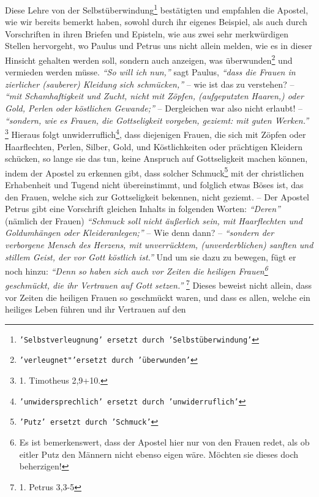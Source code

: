 Diese Lehre von der Selbstüberwindung\footnote{\texttt{'Selbstverleugnung' ersetzt 
durch 'Selbstüberwindung'}} bestätigten und empfahlen die Apostel, wie
wir bereits bemerkt haben, sowohl durch ihr eigenes Beispiel, als auch durch
Vorschriften in ihren Briefen und Episteln, wie aus zwei sehr merkwürdigen
Stellen hervorgeht, wo Paulus und Petrus uns nicht allein melden, wie es in
dieser Hinsicht gehalten werden soll, sondern auch anzeigen, was überwunden\footnote{\texttt{'verleugnet"'ersetzt durch 'überwunden'}} und
vermieden werden müsse. \textit{"`So will ich nun,"'} sagt Paulus,
\textit{"`dass die Frauen in
zierlicher (sauberer) Kleidung sich schmücken,"'} -- wie ist das zu verstehen? --
\textit{"`mit Schamhaftigkeit und Zucht, nicht mit Zöpfen, (aufgeputzten Haaren,) oder
Gold, Perlen oder köstlichen Gewande;"'} -- Dergleichen war also nicht
erlaubt! -- \textit{"`sondern, wie es Frauen, die Gottseligkeit vorgeben, geziemt: mit
guten Werken."'}
\footnote{1. Timotheus 2,9+10.}
Hieraus folgt unwiderruflich\footnote{\texttt{'unwidersprechlich' ersetzt durch 'unwiderruflich'}}, dass
diejenigen Frauen, die sich mit Zöpfen oder Haarflechten, Perlen, Silber, Gold,
und Köstlichkeiten oder prächtigen Kleidern schücken, so lange sie das tun,
keine Anspruch auf Gottseligkeit machen können, indem der Apostel zu erkennen
gibt, dass solcher Schmuck\footnote{\texttt{'Putz' ersetzt durch 'Schmuck'}} mit 
der christlichen Erhabenheit und Tugend nicht
übereinstimmt, und folglich etwas Böses ist, das den Frauen, welche sich zur
Gottseligkeit bekennen, nicht geziemt. -- Der Apostel Petrus gibt eine
Vorschrift gleichen Inhalts in folgenden Worten: \textit{"`Deren"'} (nämlich der Frauen)
\textit{"`Schmuck soll nicht äußerlich sein, mit Haarflechten und Goldumhängen oder
Kleideranlegen;"'} -- Wie denn dann? --
\textit{"`sondern der verborgene Mensch des Herzens,
mit unverrücktem, (unverderblichen) sanften und stillem Geist, der vor Gott
köstlich ist."'} Und um sie dazu zu bewegen, fügt er noch hinzu:
\textit{"`Denn so haben
sich auch vor Zeiten die heiligen Frauen\footnote{Es ist bemerkenswert, dass der
Apostel hier nur von den Frauen redet, als ob eitler Putz den
Männern nicht ebenso eigen wäre. Möchten sie dieses doch beherzigen!} geschmückt,
die ihr Vertrauen auf Gott setzen."'}
\footnote{1. Petrus 3,3-5}
Dieses beweist nicht allein, dass vor Zeiten die heiligen Frauen so 
geschmückt waren,
und dass es allen, welche ein heiliges Leben führen und ihr Vertrauen auf den
